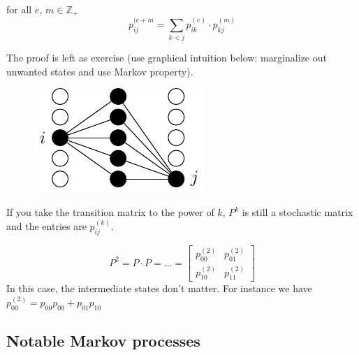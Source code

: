 \documentclass{article}
\begin{document}
\begin{proposition}{}
    for all $e$, $m \in \mathbb{Z}_+$
    \begin{equation}\label{chapkolm}
        p_{ij}^{(e+m}=\sum_{k<j}p_{ik}^{(e)}\cdot p_{kj}^{(m)}
    \end{equation}
\end{proposition}
The proof is left as exercise (use graphical intuition below: marginalize out unwanted states and use Markov property). 
\begin{figure}[H]
    \centering
 \includegraphics{standalones/pdfs/marginchain}
    \label{mc graph} %
\end{figure}

If you take the transition matrix to the power of $k$, $P^k$ is still a stochastic matrix and the entries are $p_{ij}^(k)$.
\begin{example}
    \begin{figure}[H]
    \centering
    \label{sadasdasf}
\end{figure}
\[
P^2=P\cdot P=\ldots=\begin{bmatrix}
    p_{00}^{(2)} & p_{01}^{(2)}\\
    p_{10}^{(2)} & p_{11}^{(2)}
\end{bmatrix}
\]
In this case, the intermediate states don't matter. For instance we have $p_{00}^{(2)}=p_{00}p_{00}+p_{01}p_{10}$
\end{example}
\subsection{Notable Markov processes}
\end{document}
